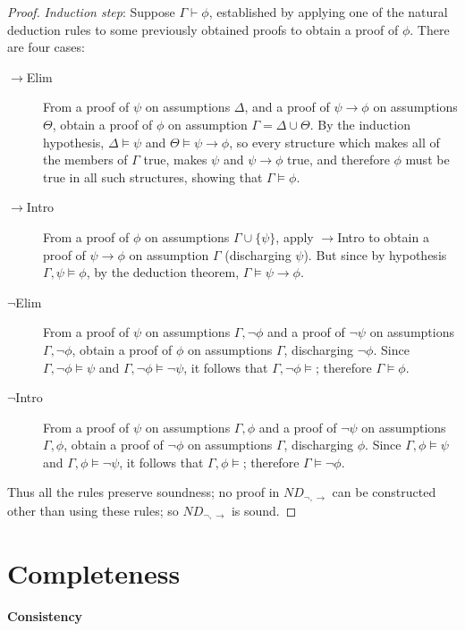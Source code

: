 {\begin{theorem}
\begin{proof}
\emph{Induction step}: Suppose $\Gamma\vdash\phi$, established by applying one of the natural deduction rules to some previously obtained proofs to obtain a proof of $\phi$. There are four cases: 
 \begin{description}
	\item [$\to$Elim] From a proof of $\psi$ on assumptions $\Delta$, and a proof of $\psi\to\phi$ on assumptions $\Theta$, obtain a proof of $\phi$ on assumption $\Gamma=\Delta\cup\Theta$. By the induction hypothesis, $\Delta \vDash \psi$ and $\Theta \vDash \psi\to\phi$, so every structure which makes all of the members of $\Gamma$ true, makes $\psi$ and $\psi\to\phi$ true, and therefore $\phi$ must be true in all such structures, showing that $\Gamma\vDash\phi$.
	\item [$\to$Intro] From a proof of $\phi$ on assumptions $\Gamma \cup \{\psi\}$, apply $\to$Intro to obtain a proof of $\psi\to\phi$ on assumption $\Gamma$ (discharging $\psi$). But since by hypothesis $\Gamma,\psi \vDash\phi$, by the deduction theorem, $\Gamma \vDash \psi\to\phi$.
	\item [$\neg$Elim] From a proof of $\psi$ on assumptions $\Gamma,\neg\phi$ and a proof of $\neg\psi$ on assumptions $\Gamma,\neg\phi$, obtain a proof of $\phi$ on assumptions $\Gamma$, discharging $\neg\phi$. Since $\Gamma,\neg\phi \vDash \psi$ and $\Gamma,\neg\phi\vDash\neg\psi$, it follows that $\Gamma,\neg\phi\vDash$; therefore $\Gamma\vDash\phi$.
		\item [$\neg$Intro] From a proof of $\psi$ on assumptions $\Gamma,\phi$ and a proof of $\neg\psi$ on assumptions $\Gamma,\phi$, obtain a proof of $\neg\phi$ on assumptions $\Gamma$, discharging $\phi$. Since $\Gamma,\phi \vDash \psi$ and $\Gamma,\phi\vDash\neg\psi$, it follows that $\Gamma,\phi\vDash$; therefore $\Gamma\vDash\neg\phi$.
\end{description}
Thus all the rules preserve soundness; no proof in $ND_{\neg,\to}$ can be constructed other than using these rules; so $ND_{\neg,\to}$ is sound. \end{proof}\end{theorem}




\section{Completeness}
\paragraph{Consistency}

}
